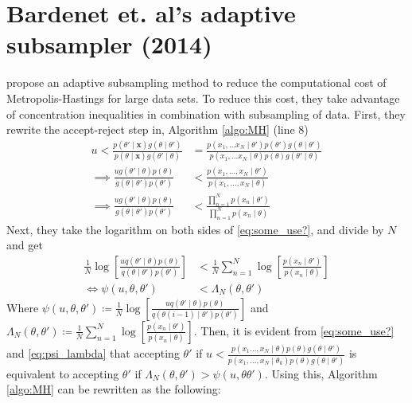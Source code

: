 \section{Bardenet et. al's adaptive subsampler (2014)}\label{sec:conf_sampler}
 \cite{Bardenet:2} propose an adaptive subsampling method to reduce the computational cost of Metropolis-Hastings for large data sets.  
To reduce this cost, they take advantage of concentration inequalities in combination with subsampling of data. 
First, they rewrite the accept-reject step in, Algorithm \ref{algo:MH}  (line 8)  
\begin{equation}\label{eq:some_use?}
\begin{split}
    u < \frac{p\left(\theta'\mid \mathbf{x}\right)g\left(\theta\mid \theta'\right)}{p \left(\theta\mid\mathbf{x}\right)g\left(\theta'\mid \theta\right)} &= \frac{p\left(x_1, \ldots x_N \mid \theta'\right) p\left(\theta'\right)g\left(\theta\mid \theta'\right)}{p\left(x_1, \ldots x_N\mid \theta\right)p\left(\theta\right)g\left(\theta'\mid\theta\right)} \\ 
    \implies \frac{u g\left(\theta'\mid \theta \right)p\left(\theta\right)}{g\left(\theta\mid\theta'\right)p\left(\theta'\right)} &< \frac{p\left(x_1, \ldots, x_N \mid \theta'\right)}{p\left(x_1, \ldots, x_N \mid \theta\right)} \\
    \implies \frac{u g\left(\theta'\mid \theta \right) p\left(\theta\right)}{g\left(\theta \mid \theta'\right) p \left(\theta'\right)} &< \frac{\prod_{n = 1}^N p\left(x_n\mid \theta'\right)}{\prod_{n = 1}^N p\left(x_n \mid \theta\right)}
    \end{split}
\end{equation}
Next, they take the logarithm on both sides of \ref{eq:some_use?}, and divide by $N$ and get
\begin{equation}\label{eq:psi_lambda}
\begin{split}
     \frac{1}{N} \log \left[\frac{u q\left(\theta' \mid \theta\right)p\left(\theta\right)}{q\left(\theta\mid \theta'\right)p\left(\theta'\right)}\right] &< \frac{1}{N} \sum_{n = 1}^N \log \left[\frac{p\left(x_n\mid \theta'\right)}{p\left(x_n \mid \theta\right)}\right] \\
     \iff  \psi\left(u, \theta, \theta'\right) &< \Lambda_N\left(\theta,\theta'\right) 
\end{split}
\end{equation}
Where $\psi\left(u, \theta, \theta'\right)\coloneqq \frac{1}{N}\log\left[\frac{u q\left(\theta'\mid\theta\right)p\left(\theta\right)}{q\left(\theta{(i-1)}\mid \theta'\right)p\left(\theta'\right)}\right]$ and $\Lambda_N\left(\theta, \theta'\right) \coloneqq \frac{1}{N}\sum_{n = 1}^N \log\left[\frac{p\left(x_n\mid \theta'\right)}{p\left(x_n\mid\theta\right)}\right]$. Then, it is evident from \eqref{eq:some_use?} and \eqref{eq:psi_lambda} that accepting $\theta'$ if $u < \frac{p\left(x_1\ldots, x_N\mid \theta\right)p\left(\theta\right)g\left(\theta\mid \theta'\right)}{p\left(x_1, \ldots, x_N\mid \theta_k\right)p\left(\theta\right)g\left(\theta\mid\theta'\right)}$ is equivalent to accepting $\theta'$ if $\Lambda_N\left(\theta, \theta'\right)>\psi\left(u,\theta\theta'\right)$. Using this, Algorithm \ref{algo:MH} can be rewritten as the following:

